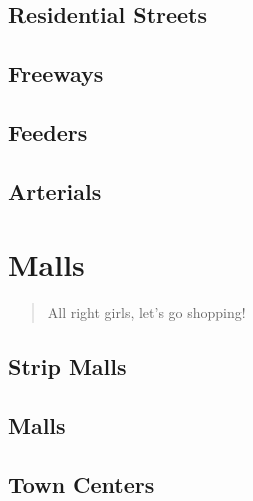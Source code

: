 \documentclass{amsbook}
\begin{document}
\section{Residential Streets}
\section{Freeways}
\section{Feeders}
\section{Arterials}
\chapter{Malls}
\begin{quotation}
    All right girls, let's go shopping!
\end{quotation}
\minitoc
\section{Strip Malls}
\section{Malls}
\section{Town Centers}


\end{document}
